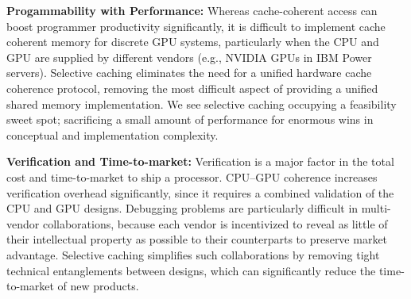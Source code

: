 \textbf{Progammability with Performance:} Whereas cache-coherent access
can boost programmer productivity significantly, it is difficult to implement
cache coherent memory for discrete GPU systems, particularly when the CPU and
GPU are supplied by different vendors (e.g., NVIDIA GPUs in IBM Power servers).
%
Selective caching eliminates the need for a unified hardware cache
coherence protocol, removing the most difficult aspect of providing a unified
shared memory implementation. We see selective caching occupying a feasibility
sweet spot; sacrificing a small amount of performance for enormous wins in
conceptual and implementation complexity.

\textbf{Verification and Time-to-market:} Verification is a major factor in the total
cost and time-to-market to ship a processor. CPU--GPU coherence increases
verification overhead significantly, since it requires a combined validation of
the CPU and GPU designs. Debugging problems are particularly difficult in
multi-vendor collaborations, because each vendor is incentivized to reveal as
little of their intellectual property as possible to their counterparts to
preserve market advantage. Selective caching simplifies such collaborations by
removing tight technical entanglements between designs, which can significantly
reduce the time-to-market of new products.

